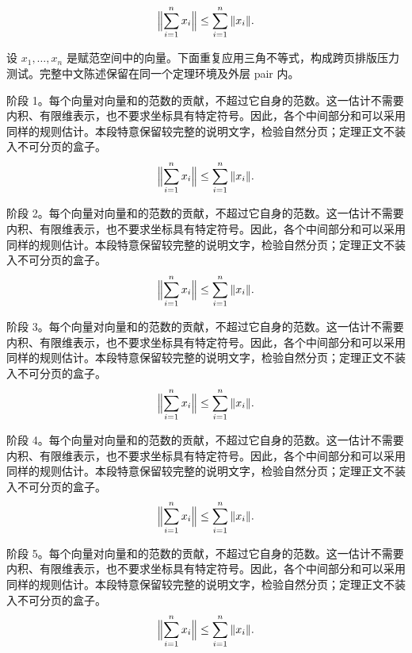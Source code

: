 \begin{pair}[\StatementKeepLines]
\begin{formaltheoremen}{}
\begin{equation*}\Bigl\|\sum_{i=1}^n x_i\Bigr\|\leq\sum_{i=1}^n\|x_i\|.\end{equation*}\label{cross:end:en}
\end{formaltheoremen}
\switchcolumn
\hypertarget{theorem:1:zh}{}\label{cross:start:zh}
\begin{formaltheoremzh}{}
设 $x_1,\ldots,x_n$ 是赋范空间中的向量。下面重复应用三角不等式，构成跨页排版压力测试。完整中文陈述保留在同一个定理环境及外层 pair 内。

\ZHIndent 阶段 1。每个向量对向量和的范数的贡献，不超过它自身的范数。这一估计不需要内积、有限维表示，也不要求坐标具有特定符号。因此，各个中间部分和可以采用同样的规则估计。本段特意保留较完整的说明文字，检验自然分页；定理正文不装入不可分页的盒子。
\begin{equation*}\Bigl\|\sum_{i=1}^n x_i\Bigr\|\leq\sum_{i=1}^n\|x_i\|.\end{equation*}

\ZHIndent 阶段 2。每个向量对向量和的范数的贡献，不超过它自身的范数。这一估计不需要内积、有限维表示，也不要求坐标具有特定符号。因此，各个中间部分和可以采用同样的规则估计。本段特意保留较完整的说明文字，检验自然分页；定理正文不装入不可分页的盒子。
\begin{equation*}\Bigl\|\sum_{i=1}^n x_i\Bigr\|\leq\sum_{i=1}^n\|x_i\|.\end{equation*}

\ZHIndent 阶段 3。每个向量对向量和的范数的贡献，不超过它自身的范数。这一估计不需要内积、有限维表示，也不要求坐标具有特定符号。因此，各个中间部分和可以采用同样的规则估计。本段特意保留较完整的说明文字，检验自然分页；定理正文不装入不可分页的盒子。
\begin{equation*}\Bigl\|\sum_{i=1}^n x_i\Bigr\|\leq\sum_{i=1}^n\|x_i\|.\end{equation*}

\ZHIndent 阶段 4。每个向量对向量和的范数的贡献，不超过它自身的范数。这一估计不需要内积、有限维表示，也不要求坐标具有特定符号。因此，各个中间部分和可以采用同样的规则估计。本段特意保留较完整的说明文字，检验自然分页；定理正文不装入不可分页的盒子。
\begin{equation*}\Bigl\|\sum_{i=1}^n x_i\Bigr\|\leq\sum_{i=1}^n\|x_i\|.\end{equation*}

\ZHIndent 阶段 5。每个向量对向量和的范数的贡献，不超过它自身的范数。这一估计不需要内积、有限维表示，也不要求坐标具有特定符号。因此，各个中间部分和可以采用同样的规则估计。本段特意保留较完整的说明文字，检验自然分页；定理正文不装入不可分页的盒子。
\begin{equation*}\Bigl\|\sum_{i=1}^n x_i\Bigr\|\leq\sum_{i=1}^n\|x_i\|.\end{equation*}


\end{formaltheoremzh}
\end{pair}
